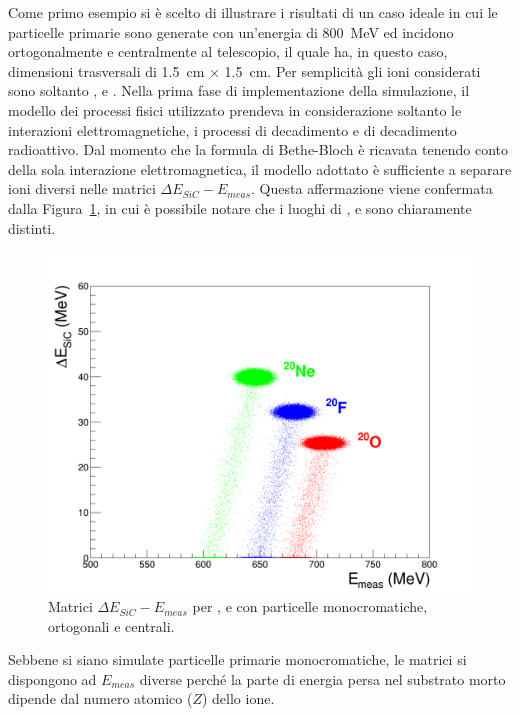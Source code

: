 Come primo esempio si è scelto di illustrare i risultati di un caso ideale in cui le particelle primarie sono generate con un'energia di 800~MeV ed incidono ortogonalmente e centralmente al telescopio, il quale ha, in questo caso, dimensioni trasversali di 1.5~cm $\times$ 1.5~cm.
Per semplicità gli ioni considerati sono soltanto ,  e .
Nella prima fase di implementazione della simulazione, il modello dei processi fisici utilizzato prendeva in considerazione soltanto le interazioni elettromagnetiche, i processi di decadimento e di decadimento radioattivo.
Dal momento che la formula di Bethe-Bloch è ricavata tenendo conto della sola interazione elettromagnetica, il modello adottato è sufficiente a separare ioni diversi nelle matrici $\Delta E_{SiC} - E_{meas}$.
Questa affermazione viene confermata dalla Figura~\ref{fig:deltaE_ETot}, in cui è possibile notare che i luoghi di ,  e  sono chiaramente distinti.
\begin{figure} [!t]
	\centering
	\includegraphics[width=\textwidth, keepaspectratio]{Grafici_Tesi2/Particelle_monocromatiche/deltaE_ETot_quadrata.png}
	\caption{Matrici $\Delta E_{SiC} - E_{meas}$ per ,  e  con particelle monocromatiche, ortogonali e centrali.} \label{fig:deltaE_ETot}
\end{figure}
Sebbene si siano simulate particelle primarie monocromatiche, le matrici si dispongono ad $E_{meas}$ diverse perché la parte di energia persa nel substrato morto dipende dal numero atomico ($Z$) dello ione.
